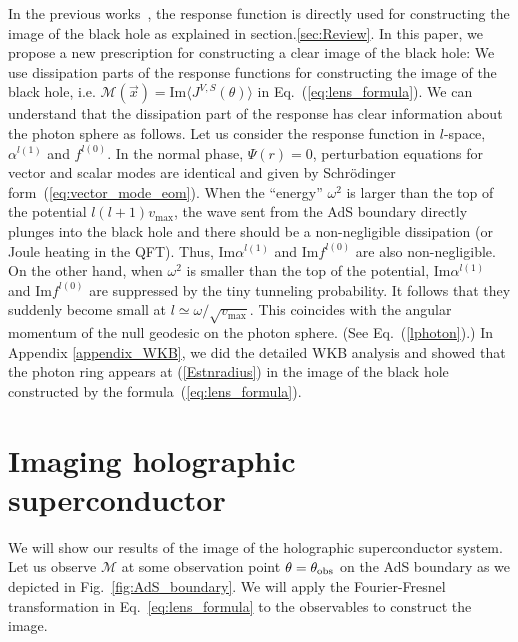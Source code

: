 \documentclass[a4paper,11pt]{article}
\begin{document}
    
    In the previous works~\cite{Hashimoto:2018okj,Hashimoto:2019jmw}, the response function is directly used for constructing the image of the black hole as explained in section.\ref{sec:Review}.
    In this paper, we propose a new prescription for constructing a clear image of the black hole: We use
    dissipation parts of the response functions for constructing the image of the black hole, i.e. $\mathcal{M} (\vec{x})=\textrm{Im}\langle J^{V,S}(\theta) \rangle$ in Eq.~(\ref{eq:lens_formula}).
    We can understand that the dissipation part of the response has  clear information about the photon sphere as follows.
    Let us consider the response function in $l$-space, $\alpha^{l(1)}$ and $f^{l(0)}$.
    In the normal phase, $\Psi(r)=0$, perturbation equations for vector and scalar modes are identical and given by Schr\"{o}dinger form~(\ref{eq:vector_mode_eom}).
    When the ``energy'' $\omega^2$ is larger than the top of the potential $l(l+1)v_\textrm{max}$, 
    the wave sent from the AdS boundary directly plunges into the black hole and there should be a non-negligible dissipation (or Joule heating in the QFT).
    Thus, Im$\alpha^{l(1)}$ and Im$f^{l(0)}$ are also non-negligible. On the other hand, when $\omega^2$ is smaller than the top of the potential, 
    Im$\alpha^{l(1)}$ and Im$f^{l(0)}$ are suppressed by the tiny tunneling probability. 
    It follows that they suddenly become small at $l \simeq \omega/\sqrt{v_\textrm{max}}$. This coincides with the angular momentum of the null geodesic on the photon sphere. (See Eq.~(\ref{lphoton}).)
    In Appendix \ref{appendix_WKB}, we did the detailed WKB analysis and 
    showed that the photon ring appears at (\ref{Estnradius}) in the image of the black hole constructed by the formula~(\ref{eq:lens_formula}).




\section{Imaging holographic superconductor}
\label{sec:imaging_sc}

     We will show our results of the image of the holographic superconductor system.
    Let us observe $\mathcal{M}$ at some observation point $\theta=\theta_{\rm{obs}}$ on the AdS boundary as we depicted in Fig.~\ref{fig:AdS_boundary}. We will apply the Fourier-Fresnel transformation in Eq.~\eqref{eq:lens_formula} to the observables to construct the image.
\end{document}
